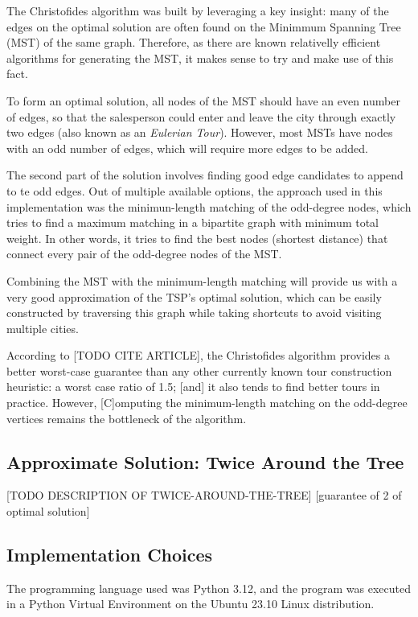 \documentclass[12pt]{article}
\begin{document}
The Christofides algorithm was built by leveraging a key insight: many of the edges on the 
optimal solution are often found on the Minimmum Spanning Tree (MST) of the same graph. Therefore, 
as there are known relativelly efficient algorithms for generating the MST, it makes 
sense to try and make use of this fact.

To form an optimal solution, all nodes of the MST should have an even number of edges, so 
that the salesperson could enter and leave the city through exactly two edges (also known as an 
\textit{Eulerian Tour}). However, most MSTs have nodes with an odd number of edges, 
which will require more edges to be added.

The second part of the solution involves finding good edge candidates to append to te odd 
edges. Out of multiple available options, the approach used in this implementation was the minimun-length
matching of the odd-degree nodes, which tries to find a maximum matching in a bipartite 
graph with minimum total weight. In other words, it tries to find the best nodes (shortest distance) 
that connect every pair of the odd-degree nodes of the MST.

Combining the MST with the minimum-length matching will provide us with a very good 
approximation of the TSP's optimal solution, which can be easily constructed by
traversing this graph while taking shortcuts to avoid visiting multiple cities.

According to [TODO CITE ARTICLE], the Christofides algorithm provides a better 
worst-case guarantee than any other currently known tour construction heuristic: a worst case ratio of 1.5; 
[and] it also tends to find better tours in practice. However, [C]omputing the minimum-length 
matching on the odd-degree vertices remains the bottleneck of the algorithm.

\subsection{Approximate Solution: Twice Around the Tree}

[TODO DESCRIPTION OF TWICE-AROUND-THE-TREE]
[guarantee of 2 of optimal solution]

\subsection{Implementation Choices}

The programming language used was Python 3.12, and the program was executed 
in a Python Virtual Environment on the Ubuntu 23.10 Linux distribution.
\end{document}
